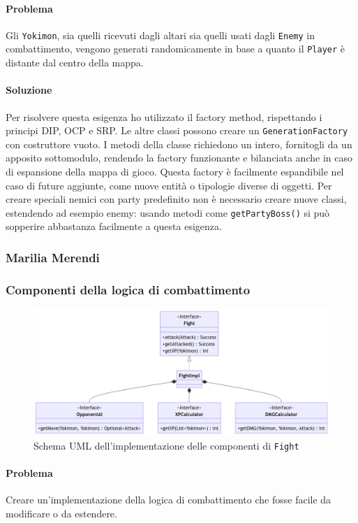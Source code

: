 \documentclass[a4paper,12pt]{report}
\begin{document}
\paragraph{Problema} Gli \texttt{Yokimon}, sia quelli ricevuti dagli altari sia quelli usati dagli \texttt{Enemy} in combattimento, vengono generati randomicamente in base a quanto il \texttt{Player} è distante dal centro della mappa.
\paragraph{Soluzione} Per risolvere questa esigenza ho utilizzato il factory method, rispettando i principi DIP, OCP e SRP. 
%
Le altre classi possono creare un \texttt{GenerationFactory} con costruttore vuoto. 
%
I metodi della classe richiedono un intero, fornitogli da un apposito sottomodulo, rendendo la factory funzionante e bilanciata anche in caso di espansione della mappa di gioco. 
%
Questa factory è facilmente espandibile nel caso di future aggiunte, come nuove entità o tipologie diverse di oggetti. 
%
Per creare speciali nemici con party predefinito non è necessario creare nuove classi, estendendo ad esempio enemy: usando metodi come \texttt{getPartyBoss()} si può sopperire abbastanza facilmente a questa esigenza.
\subsubsection{Marilia Merendi}
\subsubsection{Componenti della logica di combattimento}
\begin{figure}[H]
\centering{}
\includegraphics[width=1.0\columnwidth]{images/uml-fight.png}
\caption{Schema UML dell'implementazione delle componenti di \texttt{Fight}}
\label{img:uml-fight}
\end{figure}
\paragraph{Problema} Creare un’implementazione della logica di combattimento che fosse facile da modificare o da estendere.
\end{document}
